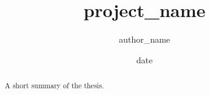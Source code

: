 \documentclass[12pt,a4paper]{report}
\title{{project_name}}
\author{{author_name}}
\date{{date}}
\begin{document}
\maketitle

\begin{abstract}
A short summary of the thesis.
\end{abstract}

\tableofcontents




\printbibliography
\end{document}
